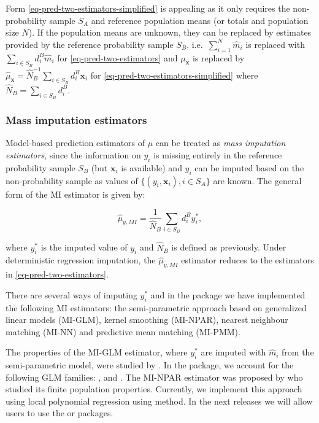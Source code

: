 \documentclass[
]{jss}
\begin{document}
Form \eqref{eq-pred-two-estimators-simplified} is appealing as it only
requires the non-probability sample \(S_A\) and reference population
means (or totals and population size \(N\)). If the population means are
unknown, they can be replaced by estimates provided by the reference
probability sample \(S_B\), i.e.~\(\sum_{i=1}^N \hat{m}_i\) is replaced
with \(\sum_{i \in S_B} d_i^B\hat{m}_i\) for
\eqref{eq-pred-two-estimators} and \(\mu_{\boldsymbol{x}}\) is replaced
by
\(\hat{\mu}_{\boldsymbol{x}}=\hat{N}_B^{-1}\sum_{i \in S_B}d_i^B\boldsymbol{x}_i\)
for \eqref{eq-pred-two-estimators-simplified} where
\(\hat{N}_B=\sum_{i \in S_B}d_i^B\).

\subsubsection{Mass imputation
estimators}\label{mass-imputation-estimators}

Model-based prediction estimators of \(\mu\) can be treated as
\textit{mass imputation estimators}, since the information on \(y_i\) is
missing entirely in the reference probability sample \(S_B\) (but
\(\boldsymbol{x}_i\) is available) and \(y_i\) can be imputed based on
the non-probability sample as values of
\(\{ (y_i, \boldsymbol{x}_i), i \in S_A\}\) are known. The general form
of the MI estimator is given by:

\begin{equation}
\hat{\mu}_{y,MI}=\frac{1}{\hat{N}_{B}} \sum_{i \in S_{B}} d_i^{B} y_i^*, 
\end{equation}

where \(y_i^*\) is the imputed value of \(y_i\) and \(\hat{N}_{B}\) is
defined as previously. Under deterministic regression imputation, the
\(\hat{\mu}_{y,MI}\) estimator reduces to the estimators in
\eqref{eq-pred-two-estimators}.

There are several ways of imputing \(y_i^*\) and in the package we have
implemented the following MI estimators: the semi-parametric approach
based on generalized linear models (MI-GLM), kernel smoothing (MI-NPAR),
nearest neighbour matching (MI-NN) and predictive mean matching
(MI-PMM).

The properties of the MI-GLM estimator, where \(y_i^*\) are imputed with
\(\hat{m}_i\) from the semi-parametric model, were studied by
\citet{kim_combining_2021}. In the  package, we account
for the following GLM families: ,  and
. The MI-NPAR estimator was proposed by
\citet{chen_nonparametric_2022} who studied its finite population
properties. Currently, we implement this approach using local polynomial
regression using  method. In the next releases we
will allow users to use the  \citep{nppkg} or 
\citep{KernSmooth} packages.
\end{document}
